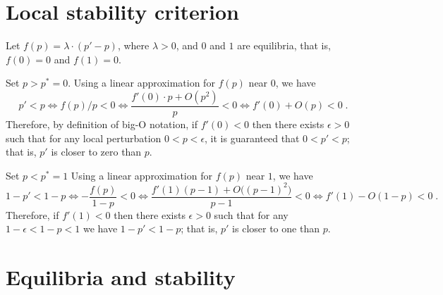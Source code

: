 \documentclass[12pt]{extarticle}
\newcommand{\beginsupplement}{%
      	\setcounter{table}{0}
        \renewcommand{\thetable}{S\arabic{table}}%
        \setcounter{figure}{0}
        \renewcommand{\thefigure}{S\arabic{figure}}%
		\setcounter{equation}{0}
        \renewcommand{\theequation}{A\arabic{equation}}%
}
\begin{document}
\newpage
\begingroup
 
 \linespread{1}\selectfont
 \setlength{\bibsep}{2pt}
 
\endgroup





\newpage
\beginsupplement %

\begin{appendices}
\linespread{1.25}
\renewcommand{\theequation}{\thesection\arabic{equation}}


\section{Local stability criterion} \label{sec:appendixA}


Let $f(p)=\lambda \cdot (p'-p)$, where $\lambda>0$, and $0$ and $1$ are equilibria, that is, $f(0)=0$ and $f(1)=0$.

Set $p>p^*=0$.
Using a linear approximation for $f(p)$ near $0$, we have
\begin{equation}
p' < p \Leftrightarrow 
f(p)/p < 0 \Leftrightarrow 
\frac{f'(0) \cdot p + O(p^2)}{p} < 0 \Leftrightarrow 
f'(0) + O(p) < 0 \;.
\end{equation}
Therefore, by definition of big-O notation, if $f'(0)<0$ then there exists $\epsilon>0$ such that for any local perturbation $0<p<\epsilon$, it is guaranteed that $0<p'<p$; that is, $p'$ is closer to zero than $p$.

Set $p<p^*=1$
Using a linear approximation for $f(p)$ near $1$, we have
\begin{equation}
1-p' < 1-p  \Leftrightarrow 
-\frac{f(p)}{1-p} < 0 \Leftrightarrow 
\frac{f'(1)(p-1) + O\big((p-1)^2\big)}{p-1} < 0 \Leftrightarrow 
f'(1) - O(1-p) < 0 \;.
\end{equation}
Therefore, if $f'(1)<0$ then there exists $\epsilon>0$ such that for any $1-\epsilon<1-p<1$ we have $1-p'<1-p$; that is, $p'$ is closer to one than $p$.


\newpage
\section{Equilibria and stability} \label{sec:appendixB}


\end{appendices}
\end{document}
